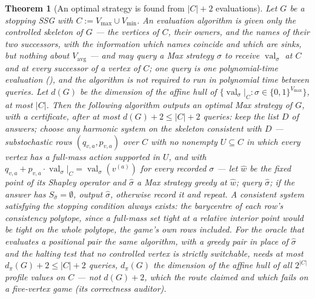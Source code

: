 \documentclass[11pt]{article}
\theoremstyle{plain}
\newtheorem{theorem}{Theorem}[section]
\theoremstyle{definition}
\DeclareMathOperator{\val}{val}
\newcommand{\Vmax}{V_{\max}}
\newcommand{\Vmin}{V_{\min}}
\newcommand{\Vavg}{V_{\mathrm{avg}}}
\begin{document}
\begin{theorem}[An optimal strategy is found from $|C|+2$ evaluations]\label{thm:eval-queries}
Let $G$ be a stopping SSG with $C:=\Vmax\cup\Vmin$. An \emph{evaluation
algorithm} is given only the controlled skeleton of $G$ --- the vertices
of $C$, their owners, and the names of their two successors, with the
information which names coincide and which are sinks, but nothing about
$\Vavg$ --- and may query a Max strategy $\sigma$ to receive
$\val_\sigma$ at $C$ and at every successor of a vertex of $C$; one query
is one polynomial-time evaluation (), and the
algorithm is not required to run in polynomial time between queries.
Let $d(G)$ be the dimension of the affine hull of
$\{\val_\sigma|_C:\sigma\in\{0,1\}^{\Vmax}\}$, at most $|C|$. Then the
following algorithm outputs an optimal Max strategy of $G$, with a
certificate, after at most $d(G)+2\le|C|+2$ queries: \emph{keep the list
$D$ of answers; choose any harmonic system on the skeleton consistent
with $D$ --- substochastic rows $(q_{v,a},p_{v,a})$ over $C$ with no
nonempty $U\subseteq C$ in which every vertex has a full-mass action
supported in $U$, and with $q_{v,a}+p_{v,a}\cdot\val_\sigma|_C=\val_\sigma(v^{(a)})$
for every recorded $\sigma$ --- let $\hat w$ be the fixed point of its
Shapley operator and $\hat\sigma$ a Max strategy greedy at $\hat w$;
query $\hat\sigma$; if the answer has $S_{\hat\sigma}=\emptyset$, output
$\hat\sigma$, otherwise record it and repeat.} A consistent system
satisfying the stopping condition always exists: the barycentre of each
row's consistency polytope, since a full-mass set tight at a relative
interior point would be tight on the whole polytope, the game's own rows
included. For the oracle that evaluates a positional \emph{pair} the
same algorithm, with a greedy pair in place of $\hat\sigma$ and the
halting test that no controlled vertex is strictly switchable, needs at
most $d_\pi(G)+2\le|C|+2$ queries, $d_\pi(G)$ the dimension of the
affine hull of all $2^{|C|}$ profile values on $C$ --- not $d(G)+2$,
which the route claimed and which fails on a five-vertex game (its
correctness auditor).
\end{theorem}
\end{document}
